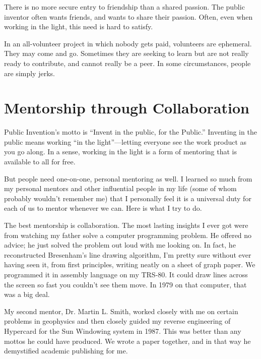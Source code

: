 \documentclass[
	fontsize=10pt, %
	twoside=false, %
	secnumdepth=1, %
]{kaobook}
\begin{document}
There is no more secure entry to friendship than a shared passion.
The public inventor often wants friends, and wants to share
their passion.
Often, even when working in the light, this need
is hard to satisfy.

In an all-volunteer project in which nobody gets paid,
volunteers are ephemeral. They may come and go.
Sometimes they are seeking to learn but are not
really ready to contribute, and cannot really
be a peer.
In some circumstances, people are simply jerks.

\section{Mentorship through Collaboration}

Public Invention’s motto is “Invent in the public, for the Public.”
Inventing in the public means working “in the light”---letting everyone see the work product as you go along.
In a sense, working in the light is a form of mentoring that is available to all for free.

But people need one-on-one, personal mentoring as well. I learned so much from my personal mentors and other influential people in my life (some of whom probably wouldn’t remember me) that I personally feel it is a universal duty for each of us to mentor whenever we can. Here is what I try to do.

The best mentorship is collaboration. The most lasting insights I ever got were from watching my father solve a computer programming problem. He offered no advice; he just solved the problem out loud with me looking on. In fact, he reconstructed Bresenham’s line drawing algorithm, I’m pretty sure without ever having seen it, from first principles, writing neatly on a sheet of graph paper. We programmed it in assembly language on my TRS-80. It could draw lines across the screen so fast you couldn’t see them move. In 1979 on that computer, that was a big deal.

My second mentor, Dr. Martin L. Smith, worked closely with me on certain problems in geophysics and then closely guided my reverse engineering of Hypercard for the Sun Windowing system in 1987. This was better than any mottos he could have produced. We wrote a paper together, and in that way he demystified academic publishing for me.
\end{document}
